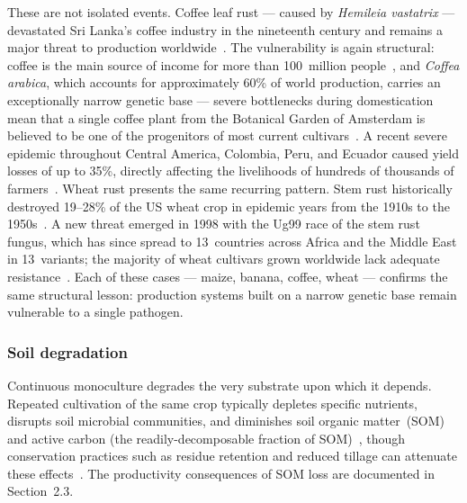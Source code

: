 These are not isolated events. Coffee leaf rust --- caused by \textit{Hemileia vastatrix} --- devastated Sri Lanka's coffee industry in the nineteenth century and remains a major threat to production worldwide~\cite[p.~1039]{Talhinhas2017}. The vulnerability is again structural: coffee is the main source of income for more than 100~million people~\cite[p.~1039]{Talhinhas2017}, and \textit{Coffea arabica}, which accounts for approximately 60\% of world production, carries an exceptionally narrow genetic base --- severe bottlenecks during domestication mean that a single coffee plant from the Botanical Garden of Amsterdam is believed to be one of the progenitors of most current cultivars~\cite[p.~1039]{Talhinhas2017}. A recent severe epidemic throughout Central America, Colombia, Peru, and Ecuador caused yield losses of up to 35\%, directly affecting the livelihoods of hundreds of thousands of farmers~\cite[p.~1040]{Talhinhas2017}. Wheat rust presents the same recurring pattern. Stem rust historically destroyed 19--28\% of the US wheat crop in epidemic years from the 1910s to the 1950s~\cite[pp.~304--305]{Singh2015}. A new threat emerged in 1998 with the Ug99 race of the stem rust fungus, which has since spread to 13~countries across Africa and the Middle East in 13~variants; the majority of wheat cultivars grown worldwide lack adequate resistance~\cite[pp.~305,~309]{Singh2015}. Each of these cases --- maize, banana, coffee, wheat --- confirms the same structural lesson: production systems built on a narrow genetic base remain vulnerable to a single pathogen.


\subsubsection{Soil degradation}\label{sec:monoculture-soil}

Continuous monoculture degrades the very substrate upon which it depends.
Repeated cultivation of the same crop typically depletes specific nutrients,
disrupts soil microbial communities, and diminishes soil organic matter~(SOM)
and active carbon (the readily-decomposable fraction of SOM)~\cite[Abstract]{Pervaiz2020}, though
conservation practices such as residue retention and reduced tillage can
attenuate these effects~\cite[p.~15]{Pervaiz2020}. The productivity
consequences of SOM loss are documented in Section~2.3.

